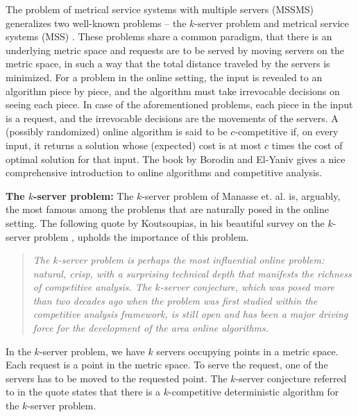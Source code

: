 \documentclass[11pt]{article}
\theoremstyle{plain}\newtheorem{theorem}{Theorem}
\theoremstyle{definition}
\theoremstyle{remark}
\begin{document}
The problem of metrical service systems with multiple servers (MSSMS) generalizes two well-known problems -- the $k$-server problem \cite{ManasseMS88} and metrical service systems (MSS) \cite{ChrobakL92,ManasseMS88}. These problems share a common paradigm, that there is an underlying metric space 
and requests are to be served by moving servers on the metric space, in such a way that the total distance traveled by the servers is minimized.
For a problem in the online setting, the input is revealed to an algorithm piece by piece, and the algorithm must take irrevocable decisions on seeing each piece. In case of the aforementioned problems, each piece in the input is a request, and the irrevocable decisions are the movements of the servers. A (possibly randomized) online algorithm is said to be $c$-competitive if, on every input, it returns a solution whose (expected) cost is at most $c$ times the cost of optimal solution for that input. The book by Borodin and El-Yaniv \cite{BorodinE} gives a nice comprehensive introduction to online algorithms and competitive analysis.


\noindent
\textbf{The $k$-server problem:} The $k$-server problem of Manasse et. al. \cite{ManasseMS88} is, arguably, the most famous among the problems that are naturally posed in the online setting. The following quote by Koutsoupias, in his beautiful survey on the $k$-server problem \cite{Koutsoupias09}, upholds the importance of this problem.
\begin{quote}
\textit{The $k$-server problem is perhaps the most influential online problem: natural, crisp, with a surprising technical depth that manifests the richness of competitive analysis. The $k$-server conjecture, which was posed more than two decades ago when the problem was first studied within the competitive analysis framework, is still open and has been a major driving force for the development of the area online algorithms.}
\end{quote}
In the $k$-server problem, we have $k$ servers occupying points in a metric space. Each request is a point in the metric space. To serve the request, one of the servers has to be moved to the requested point. The $k$-server conjecture referred to in the quote states that there is a $k$-competitive deterministic algorithm for the $k$-server problem.
\end{document}
